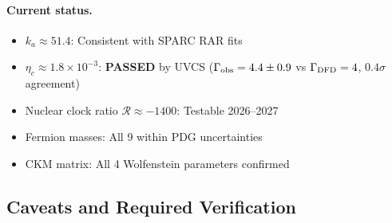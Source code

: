 \paragraph{Current status.}
\begin{itemize}
\item $k_a \approx 51.4$: Consistent with SPARC RAR fits
\item $\eta_c \approx 1.8 \times 10^{-3}$: \textbf{PASSED} by UVCS ($\Gamma_{\rm obs} = 4.4 \pm 0.9$ vs $\Gamma_{\rm DFD} = 4$, $0.4\sigma$ agreement)
\item Nuclear clock ratio $\mathcal{R} \approx -1400$: Testable 2026--2027
\item Fermion masses: All 9 within PDG uncertainties
\item CKM matrix: All 4 Wolfenstein parameters confirmed
\end{itemize}

\subsection{Caveats and Required Verification}\label{sec:quantum-caveats}


